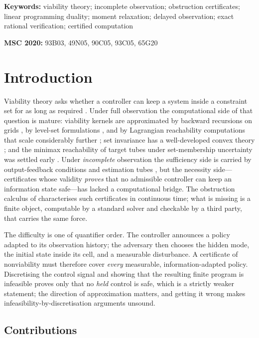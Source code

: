 \documentclass[11pt,a4paper]{article}
\theoremstyle{plain}
\theoremstyle{definition}
\theoremstyle{remark}
\begin{document}
\medskip
\noindent\textbf{Keywords:} viability theory; incomplete observation; obstruction certificates; linear programming duality; moment relaxation; delayed observation; exact rational verification; certified computation

\medskip
\noindent\textbf{MSC 2020:} 93B03, 49N05, 90C05, 93C05, 65G20

\section{Introduction}\label{sec:intro}

Viability theory asks whether a controller can keep a system inside a constraint set for as long as required \cite{Aubin1991}. Under full observation the computational side of that question is mature: viability kernels are approximated by backward recursions on grids \cite{SaintPierre1994}, by level-set formulations \cite{MitchellBayenTomlin2005}, and by Lagrangian reachability computations that scale considerably further \cite{Maidens2013}; set invariance has a well-developed convex theory \cite{Blanchini1999}; and the minimax reachability of target tubes under set-membership uncertainty was settled early \cite{BertsekasRhodes1971}. Under \emph{incomplete} observation the sufficiency side is carried by output-feedback conditions and estimation tubes \cite{Veliov1993}, but the necessity side---certificates whose validity \emph{proves} that no admissible controller can keep an information state safe---has lacked a computational bridge. The obstruction calculus of \cite{Abaee2026calc} characterises such certificates in continuous time; what is missing is a finite object, computable by a standard solver and checkable by a third party, that carries the same force.

The difficulty is one of quantifier order. The controller announces a policy adapted to its observation history; the adversary then chooses the hidden mode, the initial state inside its cell, and a measurable disturbance. A certificate of nonviability must therefore cover \emph{every} measurable, information-adapted policy. Discretising the control signal and showing that the resulting finite program is infeasible proves only that no \emph{held} control is safe, which is a strictly weaker statement; the direction of approximation matters, and getting it wrong makes infeasibility-by-discretisation arguments unsound.

\subsection{Contributions}
\end{document}
